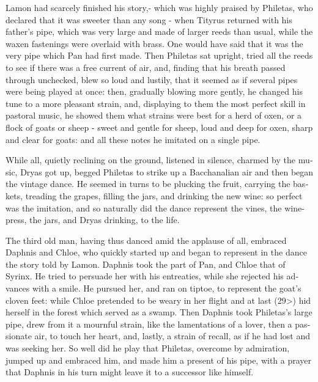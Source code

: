 \documentclass{book}
\begin{document}
\begin{pairs}
\begin{Rightside}
\begin{english}
  Lamon had scarcely finished his story,- which was highly praised by Philetas, who declared that it was sweeter than any song - when Tityrus returned with his father's pipe, which was very large and made of larger reeds than usual, while the waxen fastenings were overlaid with brass.  One would have said that it was the very pipe which Pan had first made.  Then Philetas sat upright, tried all the reeds to see if there was a free current of air, and, finding that his breath passed through unchecked, blew so loud and lustily, that it seemed as if several pipes were being played at once: then, gradually blowing more gently, he changed his tune to a more pleasant strain, and, displaying to them the most perfect skill in pastoral music, he showed them what strains were best for a herd of oxen, or a flock of goats or sheep - sweet and gentle for sheep, loud and deep for oxen, sharp and clear for goats: and all these notes he imitated on a single pipe.
\pend


  While all, quietly reclining on the ground, listened in silence, charmed by the music, Dryas got up, begged Philetas to strike up a Bacchanalian air and then began the vintage dance. He seemed in turns to be plucking the fruit, carrying the baskets, treading the grapes, filling the jars, and drinking the new wine: so perfect was the imitation, and so naturally did the dance represent the vines, the wine-press, the jars, and Dryas drinking, to the life.
\pend


  The third old man, having thus danced amid the applause of all, embraced Daphnis and Chloe, who quickly started up and began to represent in the dance the story told by Lamon.  Daphnis took the part of Pan, and Chloe that of Syrinx. He tried to persuade her with his entreaties, while she rejected his advances with a smile. He pursued her, and ran on tiptoe, to represent the goat's cloven feet: while Chloe pretended to be weary in her flight and at last (29>) hid herself in the forest which served as a swamp.  Then Daphnis took Philetas's large pipe, drew from it a mournful strain, like the lamentations of a lover, then a passionate air, to touch her heart, and, lastly, a strain of recall, as if he had lost and was seeking her.  So well did he play that Philetas, overcome by admiration, jumped up and embraced him, and made him a present of his pipe, with a prayer that Daphnis in his turn might leave it to a successor like himself.
\pend



\end{english}
\end{Rightside}
\end{pairs}
\end{document}
